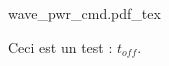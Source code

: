 \documentclass[a4paper]{article}
\newcommand{\toff}{\ensuremath{\mathit{t_{off}}}}
\begin{document}
\begin{center}
    \def\svgwidth{17cm}
    {wave_pwr_cmd.pdf_tex}
\end{center}
Ceci est un test : \toff .
\end{document}
